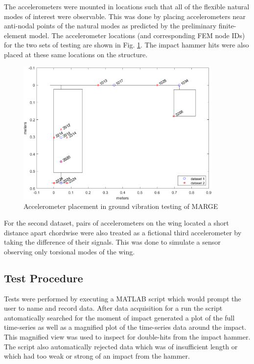 The accelerometers were mounted in locations such that all of the flexible natural modes of interest were observable. This was done by placing accelerometers near anti-nodal points of the natural modes as predicted by the preliminary finite-element model. The accelerometer locations (and corresponding FEM node IDs) for the two sets of testing are shown in Fig. \ref{fig:accelPlacement}. The impact hammer hits were also placed at these same locations on the structure.
\begin{figure}[h]
    \centering
    \includegraphics[width=4in]{figs/GVT/accelLocPlot.png}
    \caption{Accelerometer placement in ground vibration testing of MARGE}
    \label{fig:accelPlacement}
\end{figure}

For the second dataset, pairs of accelerometers on the wing located a short distance apart chordwise were also treated as a fictional third accelerometer by taking the difference of their signals. This was done to simulate a sensor observing only torsional modes of the wing.

\subsection{Test Procedure}

Tests were performed by executing a MATLAB script which would prompt the user to name and record data. After data acquisition for a run the script automatically searched for the moment of impact generated a plot of the full time-series as well as a magnified plot of the time-series data around the impact. This magnified view was used to inspect for double-hits from the impact hammer. The script also automatically rejected data which was of insufficient length or which had too weak or strong of an impact from the hammer.

